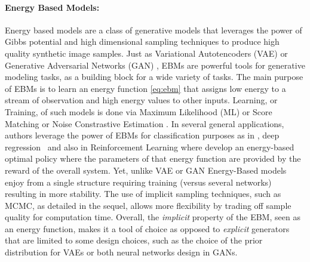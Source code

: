 \documentclass[10pt,twocolumn,letterpaper]{article}
\begin{document}
\paragraph{Energy Based Models: }
Energy based models \cite{lecun2006tutorial,ngiam2011learning} are a class of generative models that leverages the power of Gibbs potential and high dimensional sampling techniques to produce high quality synthetic image samples.
Just as Variational Autotencoders (VAE) \cite{kingma2013auto} or Generative Adversarial Networks (GAN) \cite{goodfellow2014generative}, EBMs are powerful tools for generative modeling tasks, as a building block for a wide variety of tasks. 
The main purpose of EBMs is to learn an energy function \eqref{eq:ebm} that assigns low energy to a stream of observation and high energy values to other inputs.
Learning, or Training, of such models is done via Maximum Likelihood (ML) \cite{du2019implicit} or Score Matching \cite{song2020score} or Noise Constrastive Estimation \cite{gao2020flow}.
In several general applications, authors leverage the power of EBMs for classification purposes as in \cite{grathwohl2020your}, deep regression~\cite{gustafsson2020energy} and also in Reinforcement Learning where \cite{haarnoja2018soft} develop an energy-based optimal policy where the parameters of that energy function are provided by the reward of the overall system.
Yet, unlike VAE or GAN Energy-Based models enjoy from a single structure requiring training (versus several networks) resulting in more stability.
The use of implicit sampling techniques, such as MCMC, as detailed in the sequel, allows more flexibility by trading off sample quality for computation time.
Overall, the \emph{implicit} property of the EBM, seen as an energy function, makes it a tool of choice as opposed to \emph{explicit} generators that are limited to some design choices, such as the choice of the prior distribution for VAEs or both neural networks design in GANs.
\end{document}
